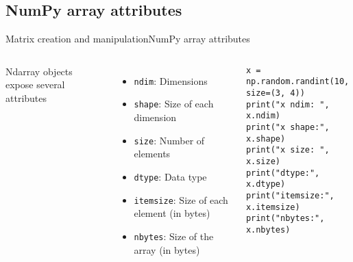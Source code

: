 \documentclass[10pt,compress]{beamer} %
\begin{document}
\subsection{NumPy array attributes}
\begin{frame}[fragile]{Matrix creation and manipulation}{NumPy array attributes}
	\begin{columns}
		Ndarray objects expose several attributes
		\begin{itemize}
			\item \texttt{ndim}: Dimensions
			\item \texttt{shape}: Size of each dimension
			\item \texttt{size}: Number of elements
			\item \texttt{dtype}: Data type
			\item \texttt{itemsize}: Size of each element (in bytes)
			\item \texttt{nbytes}: Size of the array (in bytes)
		\end{itemize}

		\begin{exampleblock}{}
		\vspace{-0.2cm} 
			\begin{lstlisting}
x = np.random.randint(10, size=(3, 4))
print("x ndim: ", x.ndim)
print("x shape:", x.shape)
print("x size: ", x.size)
print("dtype:", x.dtype)
print("itemsize:", x.itemsize)
print("nbytes:", x.nbytes)
			\end{lstlisting}
		\vspace{-0.2cm} 
		\end{exampleblock}
	\end{columns}
\end{frame}
\end{document}
